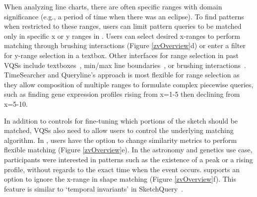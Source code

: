 \par When analyzing line charts,
there are often specific ranges with
domain significance (e.g., a period of time when there was an eclipse). 
To find patterns when restricted to these ranges, 
users can limit pattern queries 
to be matched only in specific x or y ranges in \zvpp. Users can select desired x-ranges 
to perform matching through brushing interactions 
(Figure \ref{zvOverview}d) 
or enter a filter for y-range selection in a textbox. 
Other interfaces for range selection in past VQSs 
include textboxes~\cite{wattenberg2001sketching,Mannino2018}, 
min/max line boundaries~\cite{ryall2005querylines}, 
or brushing interactions~\cite{Hochheiser2001}. 
TimeSearcher and Queryline's approach is 
most flexible for range selection as 
they allow composition of multiple ranges 
to formulate complex piecewise queries, 
such as finding gene expression profiles 
rising from x=1-5 then declining from x=5-10. 
\par In addition to controls for fine-tuning
which portions of the sketch should be matched,
VQSs also need to allow users
to control the underlying matching algorithm. 
In \zvpp, users have the option to change 
similarity metrics to perform 
flexible matching (Figure \ref{zvOverview}e). 
In the astronomy and genetics use case, 
participants were interested in patterns 
such as the existence of a peak or a rising profile, 
without regards to the exact time when the event occurs. 
\zvpp supports an option to ignore 
the x-range in shape matching (Figure \ref{zvOverview}f). 
This feature is similar to `temporal invariants' in SketchQuery~\cite{correll2016semantics}.
